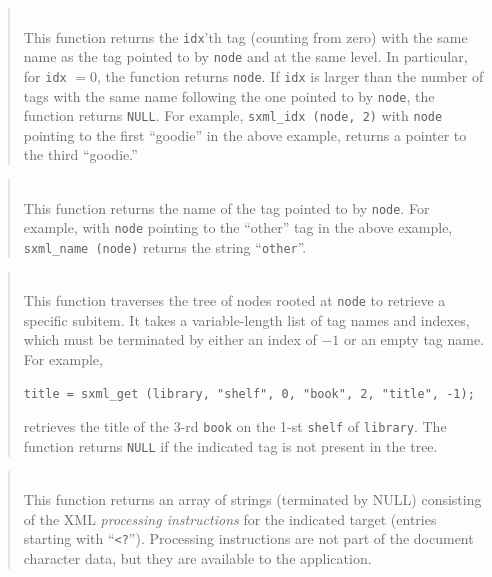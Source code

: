 \begin{quote}
\noindent\hspace{-0.35in}{\tt sxml\_t sxml\_idx (sxml\_t node, int idx); }\\ \hspace{0in}
This function returns the {\tt idx}'th tag (counting from zero) with the same
name as the tag pointed to by {\tt node} and at the same level.
In particular, for {\tt idx} $= 0$, the function returns {\tt node}.
If {\tt idx} is larger than the number of tags with the same name
following the one pointed to by {\tt node}, the function returns {\tt NULL}.
For example, {\tt sxml\_idx (node, 2)} with {\tt node} pointing to
the first ``goodie'' in the above example, returns a pointer to the third
``goodie.''
\end{quote}

\begin{quote}
\noindent\hspace{-0.35in}{\tt char *sxml\_name (sxml\_t node); }\\ \hspace{0in}
This function returns the name of the tag pointed to by {\tt node}.
For example, with {\tt node} pointing to the ``other'' tag in the above
example, {\tt sxml\_name (node)} returns the string ``{\tt other}''.
\end{quote}

\begin{quote}
\noindent\hspace{-0.35in}{\tt sxml\_t sxml\_get (sxml\_t node, ...); }\\ \hspace{0in}
This function traverses the tree of nodes rooted at {\tt node}
to retrieve a specific subitem.
It takes a variable-length list of tag names and indexes, which
must be terminated by either an index of $-1$ or an empty tag name.
For example,
\begin{verbatim}
title = sxml_get (library, "shelf", 0, "book", 2, "title", -1);
\end{verbatim}
retrieves the title of the 3-rd {\tt book} on the 1-st {\tt shelf} of
{\tt library}.
The function returns {\tt NULL} if the indicated tag is not present in the
tree.
\end{quote}

\begin{quote}
\noindent\hspace{-0.35in}{\tt const char **sxml\_pi (sxml\_t node, const char *target); }\\ \hspace{0in}
This function returns an array of strings (terminated by NULL) consisting of
the XML {\em processing instructions\/} for the indicated target (entries
starting with ``{\tt <?}'').
Processing instructions are not part of the document character data, but they
are available to the application.
\end{quote}

